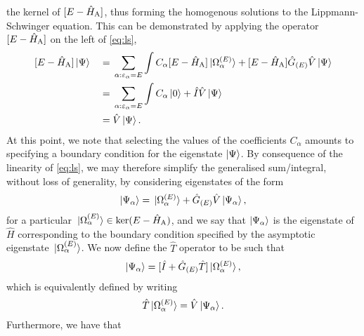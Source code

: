 \documentclass[draft]{article}
\begin{document}
the kernel of $[E - \hat{H}_{\rm{A}}]$, thus forming the homogenous
solutions to the Lippmann-Schwinger equation.
This can be demonstrated by applying the operator $[E - \hat{H}_{\rm{A}}]$
on the left of \autoref{eq:ls},
\begin{alignat*}{2}
  &
  [
    E
    -
    \hat{H}_{\rm{A}}
  ]
  \ket{\Psi}
  &
  {}={}
  &
  \sum_{\alpha : \varepsilon_{\alpha} = E}\int
  C_{\alpha}
  [
    E
    -
    \hat{H}_{\rm{A}}
  ]
  \ket*{\Omega_{\alpha}^{(E)}}
  +
  [
    E
    -
    \hat{H}_{\rm{A}}
  ]
  \hat{G}_{(E)}
  \hat{V}
  \ket{\Psi}
  \\
  &
  &
  {}={}
  &
  \sum_{\alpha : \varepsilon_{\alpha} = E}\int
  C_{\alpha}
  \ket{0}
  +
  \hat{I}
  \hat{V}
  \ket{\Psi}
  \\
  &
  &
  {}={}
  &
  \hat{V}
  \ket{\Psi}
  .
\end{alignat*}
At this point, we note that selecting the values of the coefficients
$C_{\alpha}$ amounts to specifying a boundary condition for the eigenstate
$\ket{\Psi}$.
By consequence of the linearity of \autoref{eq:ls}, we may therefore simplify
the generalised sum/integral, without loss of generality, by considering
eigenstates of the form
\begin{equation}
  \label{eq:ls-boundary}
  \ket{\Psi_{\alpha}}
  =
  \ket*{\Omega_{\alpha}^{(E)}}
  +
  \hat{G}_{(E)}
  \hat{V}
  \ket{\Psi_{\alpha}}
  ,
\end{equation}
for a particular
$\ket*{\Omega_{\alpha}^{(E)}} \in \ker(E - \hat{H}_{\rm{A}})$, and we say
that $\ket{\Psi_{\alpha}}$ is the eigenstate of $\hat{H}$ corresponding to the
boundary condition specified by the asymptotic eigenstate
$\ket*{\Omega_{\alpha}^{(E)}}$.
We now define the $\hat{T}$ operator to be such that
\begin{equation}
  \label{eq:t-operator}
  \ket{\Psi_{\alpha}}
  =
  [
    \hat{I}
    +
    \hat{G}_{(E)}
    \hat{T}
  ]
  \ket*{\Omega_{\alpha}^{(E)}}
  ,
\end{equation}
which is equivalently defined by writing
\begin{equation}
  \label{eq:t-operator-v}
  \hat{T}
  \ket*{\Omega_{\alpha}^{(E)}}
  =
  \hat{V}
  \ket{\Psi_{\alpha}}
  .
\end{equation}
Furthermore, we have that
\end{document}
